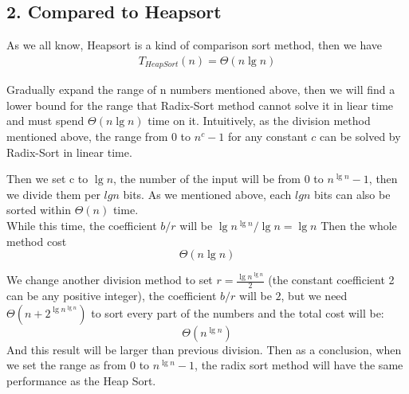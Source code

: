 \documentclass[oneside]{homework} %
\begin{document}
\subsection*{2. Compared to Heapsort}
As we all know, Heapsort is a kind of comparison sort method, then we have 
\begin{equation}
  \begin{split}
	T_{HeapSort}(n) = \Theta(n \lg n)
  \end{split}
  \label{equ:hs}
\end{equation}

Gradually expand the range of n numbers mentioned above, then we will find a lower bound for the range that Radix-Sort method cannot solve it in liear time and must spend $\Theta (n \lg n)$ time on it.
Intuitively, as the division method mentioned above, the range from 0 to $n^{c}-1$ for any constant $c$ can be solved by Radix-Sort in linear time.

Then we set c to $\lg n$, the number of the input will be from 0 to $n^{\lg n}-1$, then we divide them per $lgn$ bits. As we mentioned above, each $lgn$ bits can also be sorted within $\Theta(n)$ time.  \\
While this time, the coefficient $b/r$ will be $\lg {n^{\lg n}} / \lg n  = \lg n$
Then the whole method cost 
\begin{equation}
  \Theta(n\lg n) 
  \label{equ:nlg}
\end{equation}

We change another division method to set $ r = \frac{\lg n^{\lg n}}{2}$ (the constant coefficient 2 can be any positive integer),
the coefficient $b/r$ will be $2$, but we need $\Theta (n+ 2^{\lg n^{\lg n}})$ to sort every part of the numbers and the total cost will be: 
\begin{equation}
  \Theta(n^{\lg n}) 
  \label{equ:nplgn}
\end{equation}
And this result will be larger than previous division.
Then as a conclusion, when we set the range as from 0 to $n^{\lg n}-1$, the radix sort method will have the same performance as the Heap Sort.
\end{document}
